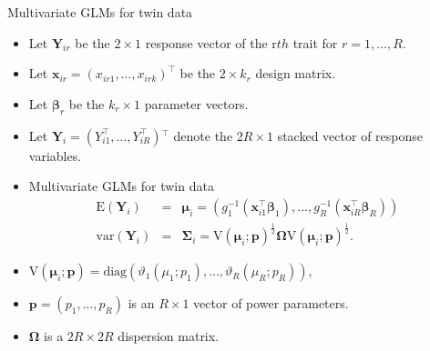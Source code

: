 \documentclass[
  ignorenonframetext,
  serif,
  professionalfont,
  usenames,
  dvipsnames,
  aspectratio = 169]{beamer}
\providecommand{\tightlist}{%
  \setlength{\itemsep}{0pt}\setlength{\parskip}{0pt}}
\renewcommand{\tightlist}{%
  \setlength{\itemsep}{0\baselineskip}
  \setlength{\parskip}{0.25\baselineskip}
}
\begin{document}
\begin{frame}{Multivariate GLMs for twin data}
\protect\hypertarget{multivariate-glms-for-twin-data}{}
\begin{itemize}
\tightlist
\item
  Let \(\mathbf{Y}_{ir}\) be the \(2 \times 1\) response vector of the
  r\(th\) trait for \(r = 1, \ldots, R\).
\item
  Let \(\mathbf{x}_{ir} = (x_{ir1}, \ldots, x_{irk})^{\top}\) be the
  \(2 \times k_r\) design matrix.
\item
  Let \(\boldsymbol{\beta}_r\) be the \(k_r \times 1\) parameter
  vectors.
\item
  Let \(\mathbf{Y}_i = (Y_{i1}^{\top}, \ldots, Y_{iR}^{\top}){^\top}\)
  denote the \(2R \times 1\) stacked vector of response variables.
\item
  Multivariate GLMs for twin data \begin{eqnarray}
  \label{modelMGLM}
  \mathrm{E}(\mathbf{Y}_i) &=& \boldsymbol{\mu}_{i} = (g_1^{-1}(\mathbf{x}_{i1}^{\top} \boldsymbol{\beta}_1), \ldots, g_{R}^{-1}(\mathbf{x}_{iR}^{\top} \boldsymbol{\beta}_R))  \nonumber \\
  \mathrm{var}(\mathbf{Y}_i) &=& \boldsymbol{\Sigma}_i = \mathrm{V}(\boldsymbol{\mu}_i;\boldsymbol{p})^{\frac{1}{2}}\boldsymbol{\Omega}\mathrm{V}(\boldsymbol{\mu}_i;\boldsymbol{p})^{\frac{1}{2}}.
  \end{eqnarray}
\item
  \(\mathrm{V}(\boldsymbol{\mu}_i; \boldsymbol{p}) = \mathrm{diag}(\vartheta_1(\mu_1;p_1), \ldots, \vartheta_R(\mu_R;p_R))\),
\item
  \(\boldsymbol{p} = (p_1, \ldots, p_R)\) is an \(R \times 1\) vector of
  power parameters.
\item
  \(\boldsymbol{\Omega}\) is a \(2R \times 2R\) dispersion matrix.
\end{itemize}
\end{frame}
\end{document}
